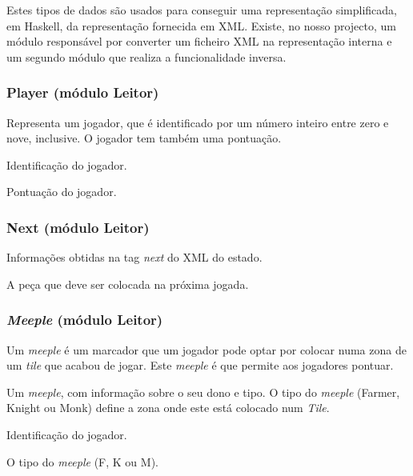 \documentclass[11pt, a4paper, twoside]{article}
\begin{document}
Estes tipos de dados são usados para conseguir uma representação simplificada, em Haskell, da representação fornecida em XML. Existe, no nosso projecto, um módulo responsável por converter um ficheiro XML na representação interna e um segundo módulo que realiza a funcionalidade inversa.

\subsubsection[Player]{Player (módulo Leitor)}

Representa um jogador, que é identificado por um número inteiro entre zero e nove, inclusive. O jogador tem também uma pontuação.

\begin{description}[style=multiline,leftmargin=3cm,font=\bfseries]
    \item[s\_player::Int] Identificação do jogador.
    \item[s\_score::Int] Pontuação do jogador.
\end{description}

\subsubsection[Next]{Next (módulo Leitor)}

Informações obtidas na tag \textit{next} do XML do estado.

\begin{description}[style=multiline,leftmargin=2.5cm,font=\bfseries]
    \item[n\_tile::Char] A peça que deve ser colocada na próxima jogada.
\end{description}

\subsubsection[Meeple]{\textit{Meeple} (módulo Leitor)}

Um \textit{meeple} é um marcador que um jogador pode optar por colocar numa zona de um \textit{tile} que acabou de jogar. Este \textit{meeple} é que permite aos jogadores pontuar.

Um \textit{meeple}, com informação sobre o seu dono e tipo. O tipo do \textit{meeple} (Farmer, Knight ou Monk) define a zona onde este está colocado num \textit{Tile}.

\begin{description}[style=multiline,leftmargin=3cm,font=\bfseries]
    \item[m\_player::Int] Identificação do jogador.
    \item[m\_type::Char] O tipo do \textit{meeple} (F, K ou M).
\end{description}
\end{document}
